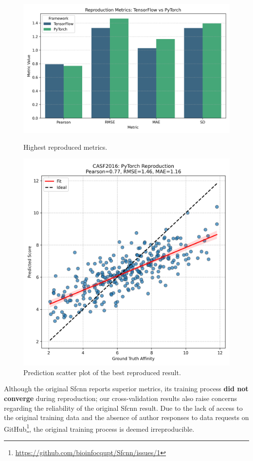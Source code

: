 \documentclass[unnumsec,webpdf,contemporary,large]{oup-authoring-template}
\theoremstyle{thmstyleone}%
\theoremstyle{thmstyletwo}%
\theoremstyle{thmstylethree}%
\begin{document}
\begin{figure}[H]
    \centering
    \begin{minipage}{0.4\textwidth}
        \centering
        \includegraphics[width=\textwidth]{images/reproduction_metrics_comparison_seaborn.png}
        \caption{Highest reproduced metrics.}
        \label{fig:ReproducedMetrics}
    \end{minipage}\hfill
    \begin{minipage}{0.4\textwidth}
        \centering
        \includegraphics[width=\textwidth]{images/reproduction_scatter_seaborn.png}
        \caption{Prediction scatter plot of the best reproduced result.}
        \label{fig:ReproducedScatter}
    \end{minipage}
\end{figure}
Although the original Sfcnn reports superior metrics, its training process \textbf{did not converge} during reproduction; our cross-validation results also raise concerns regarding the reliability of the original Sfcnn result. 
Due to the lack of access to the original training data and the absence of author responses to data requests on GitHub\footnote{\url{https://github.com/bioinfocqupt/Sfcnn/issues/1}}, the original training process is deemed irreproducible.
\end{document}
